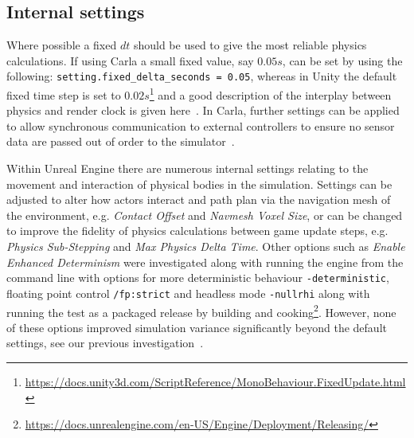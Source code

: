 \documentclass[letterpaper, 10 pt, journal, twoside]{IEEEtran}
\begin{document}
\subsection{Internal settings}
Where possible a fixed $dt$ should be used to give the most reliable physics calculations. If using Carla a small fixed value, say $0.05s$, can be set by using the following: \texttt{setting.fixed\_delta\_seconds = 0.05}, whereas in Unity the default fixed time step is set to $0.02s$\footnote{\url{https://docs.unity3d.com/ScriptReference/MonoBehaviour.FixedUpdate.html}} and a good description of the interplay between physics and render clock is given here~\cite{JohnAustinUnity}. In Carla, further settings can be applied to allow synchronous communication to external controllers to ensure no sensor data are passed out of order to the simulator~\cite{carla_sim_config}.

Within Unreal Engine there are numerous internal settings relating to the movement and interaction of physical bodies in the simulation. Settings can be adjusted to alter how actors interact and path plan via the navigation mesh of the environment, e.g. \textit{Contact Offset} and \textit{Navmesh Voxel Size}, or can be changed to improve the fidelity of physics calculations between game update steps, e.g. \textit{Physics Sub-Stepping} and \textit{Max Physics Delta Time}. Other options such as \textit{Enable Enhanced Determinism} were investigated along with running the engine from the command line with options for more deterministic behaviour \texttt{-deterministic}, floating point control \texttt{/fp:strict} and headless mode \texttt{-nullrhi} along with running the test as a packaged release by building and cooking\footnote{\url{https://docs.unrealengine.com/en-US/Engine/Deployment/Releasing/}}. However, none of these options improved simulation variance significantly beyond the default settings, see our previous investigation~\cite{TSLUnrealEngineTesting}.

\end{document}
